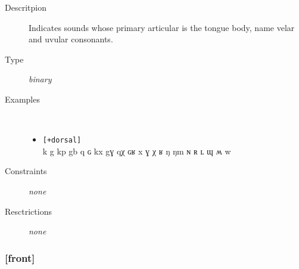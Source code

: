 \documentclass[10pt,letterpaper]{article}
\begin{document}
\begin{description}
\item[Descritpion] Indicates sounds whose primary articular is the tongue body, name velar and uvular consonants.
\item[Type] \emph{binary}
\item[Examples]\
  \begin{itemize}
    \item \texttt{[+dorsal]}\\
    k g kp gb q ɢ kx gɣ qχ ɢʁ x ɣ χ ʁ ŋ ŋm ɴ ʀ ʟ ɰ ʍ w 
  \end{itemize}
\item[Constraints] \emph{none}
\item[Resctrictions] \emph{none}
\end{description}

\subsubsection{[front]}
\label{ssub:feature_front}


\end{document}
